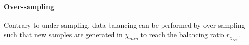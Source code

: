 \documentclass[twoside,11pt]{article}
\begin{document}



\paragraph{Over-sampling}
Contrary to under-sampling, data balancing can be performed by over-sampling such that new samples are generated in $\chi_{min}$ to reach the balancing ratio $r_{\chi_{res}}$.


\end{document}
